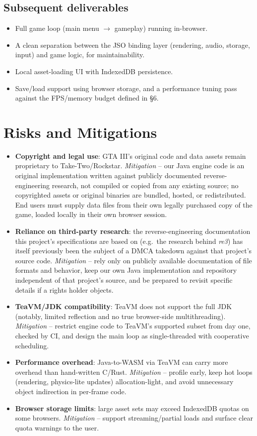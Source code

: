 \documentclass[11pt]{article}
\begin{document}
\subsection{Subsequent deliverables}
\begin{itemize}[itemsep=2pt]
  \item Full game loop (main menu $\rightarrow$ gameplay) running in-browser.
  \item A clean separation between the JSO binding layer (rendering, audio, storage, input) and game logic, for maintainability.
  \item Local asset-loading UI with IndexedDB persistence.
  \item Save/load support using browser storage, and a performance tuning pass against the FPS/memory budget defined in \S6.
\end{itemize}

\section{Risks and Mitigations}
\begin{itemize}[itemsep=3pt]
  \item \textbf{Copyright and legal use}: GTA III's original code and data assets remain proprietary to Take-Two/Rockstar. \emph{Mitigation} -- our Java engine code is an original implementation written against publicly documented reverse-engineering research, not compiled or copied from any existing source; no copyrighted assets or original binaries are bundled, hosted, or redistributed. End users must supply data files from their own legally purchased copy of the game, loaded locally in their own browser session.
  \item \textbf{Reliance on third-party research}: the reverse-engineering documentation this project's specifications are based on (e.g.\ the research behind \emph{re3}) has itself previously been the subject of a DMCA takedown against that project's source code. \emph{Mitigation} -- rely only on publicly available documentation of file formats and behavior, keep our own Java implementation and repository independent of that project's source, and be prepared to revisit specific details if a rights holder objects.
  \item \textbf{TeaVM/JDK compatibility}: TeaVM does not support the full JDK (notably, limited reflection and no true browser-side multithreading). \emph{Mitigation} -- restrict engine code to TeaVM's supported subset from day one, checked by CI, and design the main loop as single-threaded with cooperative scheduling.
  \item \textbf{Performance overhead}: Java-to-WASM via TeaVM can carry more overhead than hand-written C/Rust. \emph{Mitigation} -- profile early, keep hot loops (rendering, physics-lite updates) allocation-light, and avoid unnecessary object indirection in per-frame code.
  \item \textbf{Browser storage limits}: large asset sets may exceed IndexedDB quotas on some browsers. \emph{Mitigation} -- support streaming/partial loads and surface clear quota warnings to the user.
\end{itemize}
\end{document}
